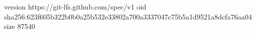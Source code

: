 version https://git-lfs.github.com/spec/v1
oid sha256:623f605b322b0b0a25b532e33802a700a3337047c75b5a1d9521a8dcfa76aa04
size 87540
